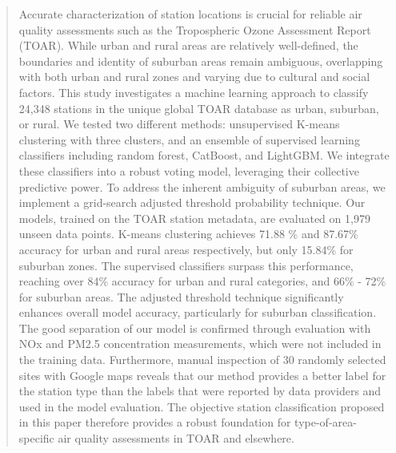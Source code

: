 \documentclass[gmd, manuscript]{copernicus}
\begin{document}
\begin{abstract}
Accurate characterization of station locations is crucial for reliable air quality assessments such as the Tropospheric Ozone Assessment Report (TOAR). While urban and rural areas are relatively well-defined, the boundaries and identity of suburban areas remain ambiguous, overlapping with both urban and rural zones and varying due to cultural and social factors. This study investigates a machine learning approach to classify 24,348 stations in the unique global TOAR database as urban, suburban, or rural. We tested two different  methods: unsupervised K-means clustering with three clusters, and an ensemble of supervised learning classifiers including random forest, CatBoost, and LightGBM. We  integrate these classifiers into a robust voting model, leveraging their collective predictive power. To address the inherent ambiguity of suburban areas, we implement a grid-search adjusted threshold probability technique. Our models, trained on the TOAR station metadata, are evaluated on 1,979 unseen data points. K-means clustering achieves 71.88 \% and 87.67\% accuracy for urban and rural areas respectively, but only 15.84\% for suburban zones. The supervised classifiers surpass this performance, reaching over 84\% accuracy for urban and rural categories, and 66\% - 72\% for suburban areas. The adjusted threshold technique significantly enhances overall model accuracy, particularly for suburban classification. The good separation of our model is confirmed through evaluation with NOx and PM2.5 concentration measurements, which were not included in the training data. Furthermore, manual inspection of 30 randomly selected sites with Google maps reveals that our method provides a better label for the station type than the labels that were reported by data providers and used in the model evaluation. The objective station classification proposed in this paper therefore provides a robust foundation for type-of-area-specific air quality assessments in TOAR and elsewhere.

\end{abstract}
\end{document}
